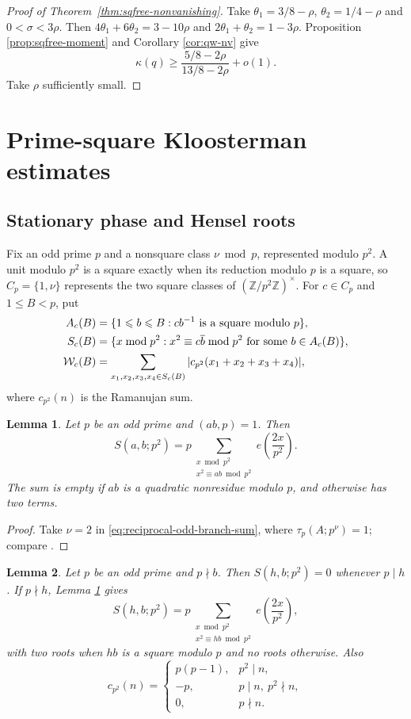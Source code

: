 \documentclass[12pt, a4paper]{amsart}
\numberwithin{equation}{section}
\newcommand{\e}{e}
\newcommand{\Z}{\mathbb{Z}}
\renewcommand{\bar}[1]{\overline{#1}}
\renewcommand{\le}{\leqslant}
\renewcommand{\ge}{\geqslant}
\theoremstyle{plain}
\newtheorem{lem}{Lemma}[section]
\begin{document}
\begin{proof}[Proof of Theorem~\ref{thm:sqfree-nonvanishing}]
Take $\theta_1=3/8-\rho$, $\theta_2=1/4-\rho$ and $0<\sigma<3\rho$. Then ${4\theta_1+6\theta_2=3-10\rho}$ and $2\theta_1+\theta_2=1-3\rho$. Proposition \ref{prop:sqfree-moment} and Corollary \ref{cor:qw-nv} give
$$
\kappa(q)\ge\frac{5/8-2\rho}{13/8-2\rho}+o(1).
$$
Take $\rho$ sufficiently small.
\end{proof}

\section{Prime-square Kloosterman estimates}\label{sec:p2-kloosterman}

\subsection{Stationary phase and Hensel roots}

Fix an odd prime $p$ and a nonsquare class $\nu\bmod p$, represented modulo $p^2$. A unit modulo $p^2$ is a square exactly when its reduction modulo $p$ is a square, so $C_p=\{1,\nu\}$ represents the two square classes of $(\Z/p^2\Z)^\times$. For $c\in C_p$ and $1\le B<p$, put
$$
\begin{aligned}
A_c(B)&=\{1\le b\le B:cb^{-1}\hbox{ is a square modulo }p\},\\
S_c(B)&=\{x\bmod p^2:x^2\equiv c\bar{b}\bmod {p^2}\hbox{ for some }b\in A_c(B)\},\\
\mathcal W_c(B)&=
\sum_{x_1,x_2,x_3,x_4\in S_c(B)}
|c_{p^2}(x_1+x_2+x_3+x_4)|,
\end{aligned}
$$
where $c_{p^2}(n)$ is the Ramanujan sum.

\begin{lem}\label{lem:p2-kloosterman-eval}
Let $p$ be an odd prime and $(ab,p)=1$. Then
$$
S(a,b;p^2)
=
p\sum_{\substack{x\bmod p^2\\ x^2\equiv ab\bmod {p^2}}}
\e\left(\frac{2x}{p^2}\right).
$$
 The sum is empty if $ab$ is a quadratic nonresidue modulo $p$, and otherwise has two terms.
\end{lem}

\begin{proof}
Take $\nu=2$ in \eqref{eq:reciprocal-odd-branch-sum}, where $\tau_p(A;p^\nu)=1$; compare \cite[Lemma~22]{BM2015}.
\end{proof}

\begin{lem}\label{lem:p2-local-ramanujan}
Let $p$ be an odd prime and $p\nmid b$. Then $S(h,b;p^2)=0$ whenever $p\mid h$. If $p\nmid h$, Lemma \ref{lem:p2-kloosterman-eval} gives
$$
S(h,b;p^2)
=
p\sum_{\substack{x\bmod p^2\\ x^2\equiv hb\bmod {p^2}}}
\e\left(\frac{2x}{p^2}\right),
$$
with two roots when $hb$ is a square modulo $p$ and no roots otherwise. Also
$$
c_{p^2}(n)=
\begin{cases}
p(p-1),&p^2\mid n,\\
-p,&p\mid n,\ p^2\nmid n,\\
0,&p\nmid n.
\end{cases}
$$
\end{lem}
\end{document}
